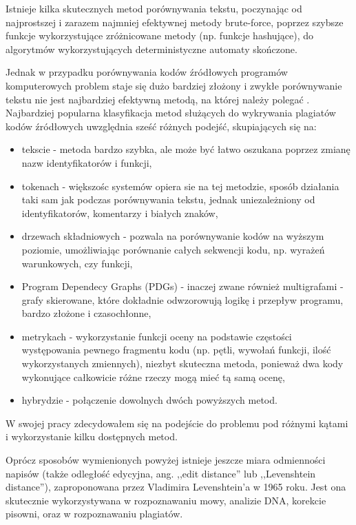 \documentclass[a4paper,12pt]{article}
\begin{document}
Istnieje kilka skutecznych metod porównywania tekstu, poczynając od najprostszej i zarazem najmniej efektywnej metody brute-force, poprzez szybsze funkcje wykorzystujące zróżnicowane metody (np. funkcje hashujące), do algorytmów wykorzystujących deterministyczne automaty skończone.

Jednak w przypadku porównywania kodów źródłowych programów komputerowych problem staje się dużo bardziej złożony i zwykłe porównywanie tekstu nie jest najbardziej efektywną metodą, na której należy polegać \cite{arwin2006}. Najbardziej popularna klasyfikacja metod służących do wykrywania plagiatów kodów źródłowych uwzględnia sześć różnych podejść, skupiających się na\cite{roycordy2007}:
\begin{itemize}
\item tekscie - metoda bardzo szybka, ale może być łatwo oszukana poprzez zmianę nazw identyfikatorów i funkcji,
\item tokenach - większośc systemów opiera sie na tej metodzie, sposób działania taki sam jak podczas porównywania tekstu, jednak uniezależniony od identyfikatorów, komentarzy i białych znaków,
\item drzewach składniowych - pozwala na porównywanie kodów na wyższym poziomie, umożliwiając porównanie całych sekwencji kodu, np. wyrażeń warunkowych, czy funkcji,
\item Program Dependecy Graphs (PDGs) - inaczej zwane również multigrafami - grafy skierowane, które dokładnie odwzorowują logikę i przepływ programu, bardzo złożone i czasochłonne,
\item metrykach - wykorzystanie funkcji oceny na podstawie częstości występowania pewnego fragmentu kodu (np. pętli, wywołań funkcji, ilość wykorzystanych zmiennych), niezbyt skuteczna metoda, ponieważ dwa kody wykonujące całkowicie różne rzeczy mogą mieć tą samą ocenę,
\item hybrydzie - połączenie dowolnych dwóch powyższych metod.
\end{itemize}

W swojej pracy zdecydowałem się na podejście do problemu pod różnymi kątami i wykorzystanie kilku dostępnych metod.

Oprócz sposobów wymienionych powyżej istnieje jeszcze miara odmienności napisów (także odległość edycyjna, ang. ,,edit distance'' lub ,,Levenshtein distance''), zaproponowana przez Vladimira Levenshtein'a w 1965 roku\cite{editdistance}. Jest ona skutecznie wykorzystywana w rozpoznawaniu mowy, analizie DNA, korekcie pisowni, oraz w rozpoznawaniu plagiatów.
\end{document}
